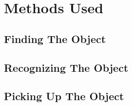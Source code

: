 \section{Methods Used}

\subsection{Finding The Object}

\subsection{Recognizing The Object}

\subsection{Picking Up The Object}

